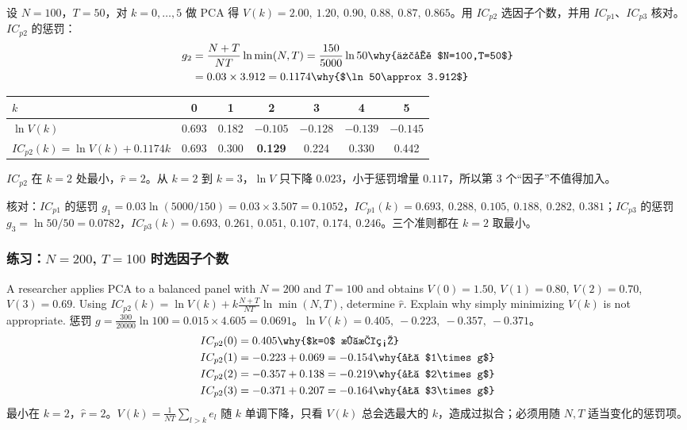 \begin{exmp}\label{ex:U13b-icp}
设 $N=100$，$T=50$，对 $k=0,\dots,5$ 做 PCA 得 $V(k)=2.00,\ 1.20,\ 0.90,\ 0.88,\ 0.87,\ 0.865$。用 $IC_{p2}$ 选因子个数，并用 $IC_{p1}$、$IC_{p3}$ 核对。
\solution
$IC_{p2}$ 的惩罚：
\begin{align*}
g_2&=\frac{N+T}{NT}\ln\min(N,T)=\frac{150}{5000}\ln50 \why{代入 $N=100,T=50$}\\
&=0.03\times3.912=0.1174 \why{$\ln 50\approx3.912$}
\end{align*}
\begin{center}
\small
\begin{tabular}{lcccccc}
\toprule
$k$ & 0 & 1 & 2 & 3 & 4 & 5\\
\midrule
$\ln V(k)$ & 0.693 & 0.182 & $-0.105$ & $-0.128$ & $-0.139$ & $-0.145$\\
$IC_{p2}(k)=\ln V(k)+0.1174k$ & 0.693 & 0.300 & \textbf{0.129} & 0.224 & 0.330 & 0.442\\
\bottomrule
\end{tabular}
\end{center}
$IC_{p2}$ 在 $k=2$ 处最小，$\hat r=2$。从 $k=2$ 到 $k=3$，$\ln V$ 只下降 $0.023$，小于惩罚增量 $0.117$，所以第 3 个“因子”不值得加入。

核对：$IC_{p1}$ 的惩罚 $g_1=0.03\ln(5000/150)=0.03\times3.507=0.1052$，$IC_{p1}(k)=0.693,\ 0.288,\ \mathbf{0.105},\ 0.188,\ 0.282,\ 0.381$；$IC_{p3}$ 的惩罚 $g_3=\ln50/50=0.0782$，$IC_{p3}(k)=0.693,\ 0.261,\ \mathbf{0.051},\ 0.107,\ 0.174,\ 0.246$。三个准则都在 $k=2$ 取最小。
\end{exmp}

\subsubsection{练习：\texorpdfstring{$N=200$, $T=100$}{N=200, T=100} 时选因子个数}

\begin{prac}\label{pr:U13b-nf}
A researcher applies PCA to a balanced panel with $N=200$ and $T=100$ and obtains $V(0)=1.50$, $V(1)=0.80$, $V(2)=0.70$, $V(3)=0.69$. Using $IC_{p2}(k)=\ln V(k)+k\frac{N+T}{NT}\ln\min(N,T)$, determine $\hat r$. Explain why simply minimizing $V(k)$ is not appropriate.
\answer
惩罚 $g=\frac{300}{20000}\ln100=0.015\times4.605=0.0691$。$\ln V(k)=0.405,\ -0.223,\ -0.357,\ -0.371$。
\begin{align*}
IC_{p2}(0)&=0.405 \why{$k=0$ 无惩罚}\\
IC_{p2}(1)&=-0.223+0.069=-0.154 \why{加 $1\times g$}\\
IC_{p2}(2)&=-0.357+0.138=-0.219 \why{加 $2\times g$}\\
IC_{p2}(3)&=-0.371+0.207=-0.164 \why{加 $3\times g$}
\end{align*}
最小在 $k=2$，$\hat r=2$。$V(k)=\frac1{NT}\sum_{l>k}e_l$ 随 $k$ 单调下降，只看 $V(k)$ 总会选最大的 $k$，造成过拟合；必须用随 $N,T$ 适当变化的惩罚项。
\end{prac}


